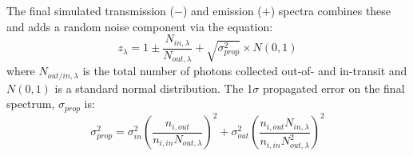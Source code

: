 \documentclass[iop]{emulateapj}
\begin{document}
The final simulated transmission ($-$) and emission ($+$) spectra combines these and 
adds a random noise component via the equation:
\begin{equation}
    z_\lambda = 1 \pm \frac{N_{in,\lambda}}{N_{out,\lambda}} + \sqrt{\sigma_{prop}^2} \times N(0,1)
\end{equation}
where $N_{out/in,\lambda}$ is the total number of photons collected out-of- and in-transit and $N(0, 1)$ is a standard normal distribution. The 1$\sigma$ propagated error on the final spectrum, $\sigma_{prop}$ is: 
\begin{equation}
    \sigma_{prop}^2 = \sigma_{in}^2 \left( \frac{n_{i,out}}{n_{i,in}N_{out,\lambda}} \right)^2 + \sigma_{out}^2 \left( \frac{n_{i,out}N_{in,\lambda}}{n_{i,in}N_{out,\lambda}^2} \right)^2
\end{equation}
\end{document}
